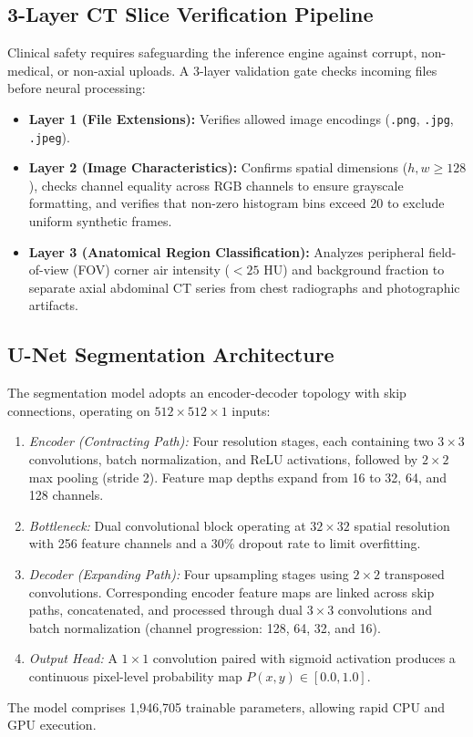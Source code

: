 \documentclass[conference]{IEEEtran}
\begin{document}
\subsection{3-Layer CT Slice Verification Pipeline}
Clinical safety requires safeguarding the inference engine against corrupt, non-medical, or non-axial uploads. A 3-layer validation gate checks incoming files before neural processing:
\begin{itemize}
    \item \textbf{Layer 1 (File Extensions):} Verifies allowed image encodings (\texttt{.png}, \texttt{.jpg}, \texttt{.jpeg}).
    \item \textbf{Layer 2 (Image Characteristics):} Confirms spatial dimensions ($h, w \ge 128$), checks channel equality across RGB channels to ensure grayscale formatting, and verifies that non-zero histogram bins exceed 20 to exclude uniform synthetic frames.
    \item \textbf{Layer 3 (Anatomical Region Classification):} Analyzes peripheral field-of-view (FOV) corner air intensity ($<25$ HU) and background fraction to separate axial abdominal CT series from chest radiographs and photographic artifacts.
\end{itemize}

\subsection{U-Net Segmentation Architecture}
The segmentation model adopts an encoder-decoder topology with skip connections, operating on $512 \times 512 \times 1$ inputs:
\begin{enumerate}
    \item \textit{Encoder (Contracting Path):} Four resolution stages, each containing two $3 \times 3$ convolutions, batch normalization, and ReLU activations, followed by $2 \times 2$ max pooling (stride 2). Feature map depths expand from 16 to 32, 64, and 128 channels.
    \item \textit{Bottleneck:} Dual convolutional block operating at $32 \times 32$ spatial resolution with 256 feature channels and a 30\% dropout rate to limit overfitting.
    \item \textit{Decoder (Expanding Path):} Four upsampling stages using $2 \times 2$ transposed convolutions. Corresponding encoder feature maps are linked across skip paths, concatenated, and processed through dual $3 \times 3$ convolutions and batch normalization (channel progression: 128, 64, 32, and 16).
    \item \textit{Output Head:} A $1 \times 1$ convolution paired with sigmoid activation produces a continuous pixel-level probability map $P(x,y) \in [0.0, 1.0]$.
\end{enumerate}
The model comprises 1,946,705 trainable parameters, allowing rapid CPU and GPU execution.
\end{document}
